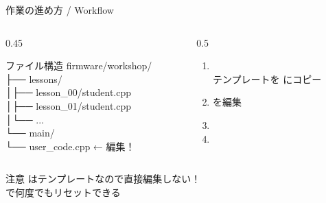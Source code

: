 \documentclass[aspectratio=169, 14pt]{beamer}
\begin{document}
\begin{frame}{作業の進め方 / Workflow}
  \begin{columns}[T]
    \begin{column}{0.45\textwidth}
      \begin{block}{ファイル構造}
        \footnotesize\ttfamily
        firmware/workshop/\\
        \hspace{1em}├── lessons/\\
        \hspace{1em}│\hspace{1em}├── lesson\_00/student.cpp\\
        \hspace{1em}│\hspace{1em}├── lesson\_01/student.cpp\\
        \hspace{1em}│\hspace{1em}└── ...\\
        \hspace{1em}└── main/\\
        \hspace{2.5em}└── user\_code.cpp ← 編集！
      \end{block}
    \end{column}
    \begin{column}{0.5\textwidth}
      \begin{enumerate}\setlength{\itemsep}{4pt}
        \item {}\\
              {\footnotesize テンプレートを  にコピー}
        \item {} を編集
        \item {}
        \item {}
      \end{enumerate}
    \end{column}
  \end{columns}

  \vspace{0.5em}

  \begin{alertblock}{注意}
     はテンプレートなので直接編集しない！\\
     で何度でもリセットできる
  \end{alertblock}
\end{frame}
\end{document}
